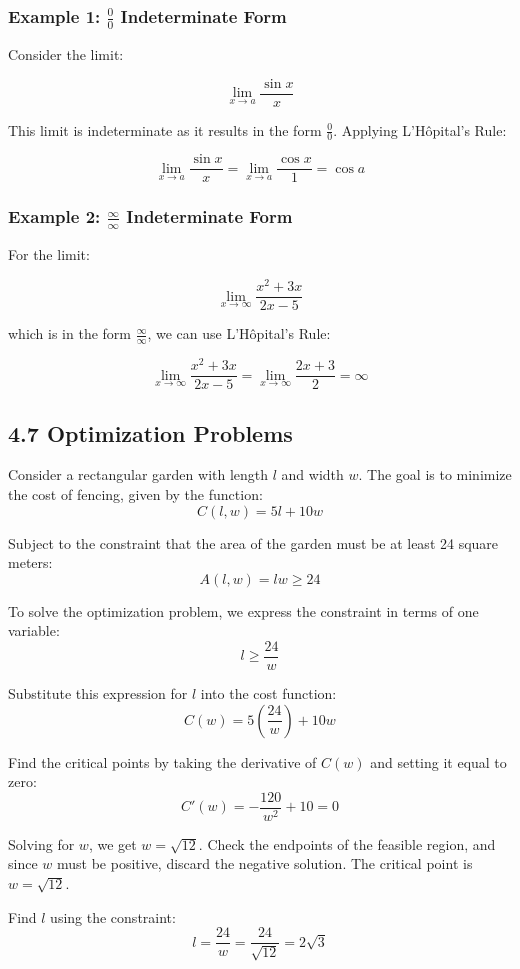 \documentclass{article}
\begin{document}
\subsubsection{Example 1: $\frac{0}{0}$ Indeterminate Form}

Consider the limit:

\[
\lim_{x \to a} \frac{\sin x}{x}
\]

This limit is indeterminate as it results in the form $\frac{0}{0}$. Applying L'Hôpital's Rule:

\[
\lim_{x \to a} \frac{\sin x}{x} = \lim_{x \to a} \frac{\cos x}{1} = \cos a
\]

\subsubsection{Example 2: $\frac{\infty}{\infty}$ Indeterminate Form}

For the limit:

\[
\lim_{x \to \infty} \frac{x^2 + 3x}{2x - 5}
\]

which is in the form $\frac{\infty}{\infty}$, we can use L'Hôpital's Rule:

\[
\lim_{x \to \infty} \frac{x^2 + 3x}{2x - 5} = \lim_{x \to \infty} \frac{2x + 3}{2} = \infty
\]

\subsection{4.7 Optimization Problems}
Consider a rectangular garden with length $l$ and width $w$. The goal is to minimize the cost of fencing, given by the function:
\[
C(l, w) = 5l + 10w
\]

Subject to the constraint that the area of the garden must be at least 24 square meters:
\[
A(l, w) = lw \geq 24
\]

To solve the optimization problem, we express the constraint in terms of one variable:
\[
l \geq \frac{24}{w}
\]

Substitute this expression for $l$ into the cost function:
\[
C(w) = 5\left(\frac{24}{w}\right) + 10w
\]

Find the critical points by taking the derivative of $C(w)$ and setting it equal to zero:
\[
C'(w) = -\frac{120}{w^2} + 10 = 0
\]

Solving for $w$, we get $w = \sqrt{12}$. Check the endpoints of the feasible region, and since $w$ must be positive, discard the negative solution. The critical point is $w = \sqrt{12}$.

Find $l$ using the constraint:
\[
l = \frac{24}{w} = \frac{24}{\sqrt{12}} = 2\sqrt{3}
\]
\end{document}
